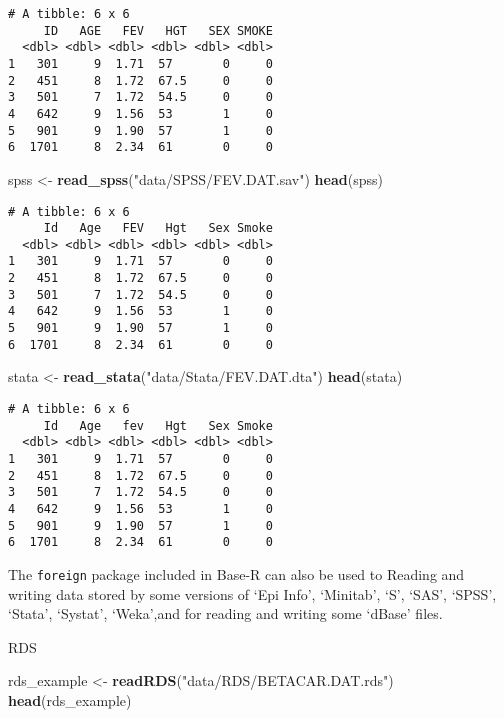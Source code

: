 \documentclass[12pt,]{article}
\newenvironment{Shaded}{\begin{snugshade}}{\end{snugshade}}
\newcommand{\KeywordTok}[1]{\textcolor[rgb]{0.13,0.29,0.53}{\textbf{#1}}}
\newcommand{\StringTok}[1]{\textcolor[rgb]{0.31,0.60,0.02}{#1}}
\newcommand{\NormalTok}[1]{#1}
\theoremstyle{definition}
\theoremstyle{definition}
\theoremstyle{definition}
\theoremstyle{remark}
\begin{document}
\begin{verbatim}
# A tibble: 6 x 6
     ID   AGE   FEV   HGT   SEX SMOKE
  <dbl> <dbl> <dbl> <dbl> <dbl> <dbl>
1   301     9  1.71  57       0     0
2   451     8  1.72  67.5     0     0
3   501     7  1.72  54.5     0     0
4   642     9  1.56  53       1     0
5   901     9  1.90  57       1     0
6  1701     8  2.34  61       0     0
\end{verbatim}

\begin{Shaded}
\begin{Highlighting}[]
\NormalTok{spss <-}\StringTok{ }\KeywordTok{read_spss}\NormalTok{(}\StringTok{"data/SPSS/FEV.DAT.sav"}\NormalTok{)}
\KeywordTok{head}\NormalTok{(spss)}
\end{Highlighting}
\end{Shaded}

\begin{verbatim}
# A tibble: 6 x 6
     Id   Age   FEV   Hgt   Sex Smoke
  <dbl> <dbl> <dbl> <dbl> <dbl> <dbl>
1   301     9  1.71  57       0     0
2   451     8  1.72  67.5     0     0
3   501     7  1.72  54.5     0     0
4   642     9  1.56  53       1     0
5   901     9  1.90  57       1     0
6  1701     8  2.34  61       0     0
\end{verbatim}

\begin{Shaded}
\begin{Highlighting}[]
\NormalTok{stata <-}\StringTok{ }\KeywordTok{read_stata}\NormalTok{(}\StringTok{"data/Stata/FEV.DAT.dta"}\NormalTok{)}
\KeywordTok{head}\NormalTok{(stata)}
\end{Highlighting}
\end{Shaded}

\begin{verbatim}
# A tibble: 6 x 6
     Id   Age   fev   Hgt   Sex Smoke
  <dbl> <dbl> <dbl> <dbl> <dbl> <dbl>
1   301     9  1.71  57       0     0
2   451     8  1.72  67.5     0     0
3   501     7  1.72  54.5     0     0
4   642     9  1.56  53       1     0
5   901     9  1.90  57       1     0
6  1701     8  2.34  61       0     0
\end{verbatim}

The \texttt{foreign} package included in Base-R can also be used to
Reading and writing data stored by some versions of `Epi Info',
`Minitab', `S', `SAS', `SPSS', `Stata', `Systat', `Weka',and for reading
and writing some `dBase' files.

RDS

\begin{Shaded}
\begin{Highlighting}[]
\NormalTok{rds_example <-}\StringTok{ }\KeywordTok{readRDS}\NormalTok{(}\StringTok{"data/RDS/BETACAR.DAT.rds"}\NormalTok{)}
\KeywordTok{head}\NormalTok{(rds_example)}
\end{Highlighting}
\end{Shaded}
\end{document}

